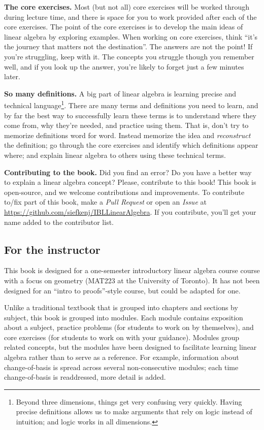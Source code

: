 {\bf The core exercises.} Most (but not all) core exercises will be
worked through during lecture time, and there is space for you to work
provided after each
of the core exercises. The point of the core exercises is to develop the main ideas of
linear algebra by exploring examples. When working on core exercises, think
``it's the journey that matters not the destination''. The
answers are not the point! If you're struggling, keep with it. The
concepts you struggle though you remember well, and if you look up the
answer, you're likely to forget just a few minutes later. 

{\bf So many definitions.} A big part of linear algebra is learning precise and
technical language\footnote{ Beyond three dimensions, things get very confusing
very quickly.  Having precise definitions allows us to make arguments that
rely on logic instead of intuition; and logic works in all dimensions.}.
There are many terms and definitions you need to learn, and by far the
best way to successfully learn these terms is to understand where they
come from, why they're needed, and practice using them. That is, don't
try to memorize definitions word for word. Instead memorize the idea
and \emph{reconstruct} the definition; go through the core exercises and
identify which definitions appear where; and explain linear algebra to
others using these technical terms.

{\bf Contributing to the book.} Did you find an error? Do you
have a better way to explain a linear algebra concept? Please,
contribute to this book!  This book is open-source, and we welcome
contributions and improvements. To contribute to/fix part of
this book, make a \emph{Pull Request} or open an \emph{Issue} at
\url{https://github.com/siefkenj/IBLLinearAlgebra}. If you contribute,
you'll get your name added to the contributor list.


\subsection*{For the instructor}

This book is designed for a one-semester introductory linear algebra course
course with a focus on geometry (MAT223 at the University of Toronto). 
It has not been designed for an ``intro to proofs''-style course, but could be adapted for one.

Unlike a traditional textbook that is grouped into chapters and sections
by subject, this book is grouped into modules. Each module contains exposition
about a subject, practice problems (for students to work on by themselves), and core exercises
(for students to work on with your guidance). Modules group related concepts, but the 
modules have been designed to facilitate learning linear algebra rather than to serve
as a reference. For example, information about change-of-basis is spread across several non-consecutive
modules; each time change-of-basis is readdressed, more detail is added.

